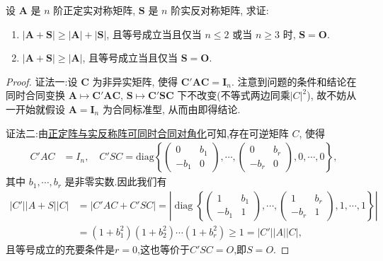 \documentclass[../../main.tex]{subfiles}%
\begin{document}
\begin{proposition}\label{proposition:A+S的行列式的相关结论}
设 \(\boldsymbol{A}\) 是 \(n\) 阶正定实对称矩阵, \(\boldsymbol{S}\) 是 \(n\) 阶实反对称矩阵, 求证:
\begin{enumerate}[(1)]
\item \(|\boldsymbol{A}+\boldsymbol{S}|\geqslant |\boldsymbol{A}|+|\boldsymbol{S}|\), 且等号成立当且仅当 \(n\leqslant 2\) 或当 \(n\geqslant 3\) 时, \(\boldsymbol{S}=\boldsymbol{O}\).
\item \(|\boldsymbol{A}+\boldsymbol{S}|\geqslant |\boldsymbol{A}|\), 且等号成立当且仅当 \(\boldsymbol{S}=\boldsymbol{O}\).
\end{enumerate}
\end{proposition}
\begin{proof}

{\color{blue}证法一:}设 \(\boldsymbol{C}\) 为非异实矩阵, 使得 \(\boldsymbol{C}'\boldsymbol{A}\boldsymbol{C}=\boldsymbol{I}_n\). 注意到问题的条件和结论在同时合同变换 \(\boldsymbol{A}\mapsto\boldsymbol{C}'\boldsymbol{A}\boldsymbol{C}\), \(\boldsymbol{S}\mapsto\boldsymbol{C}'\boldsymbol{S}\boldsymbol{C}\) 下不改变(不等式两边同乘$|C|^2$), 故不妨从一开始就假设 \(\boldsymbol{A}=\boldsymbol{I}_n\) 为合同标准型, 从而由即得结论. 

{\color{blue}证法二:}由\hyperref[proposition:正定阵与实反称阵可同时合同对角化-例9.114]{正定阵与实反称阵可同时合同对角化}可知,存在可逆矩阵 $C$, 使得
\begin{align*}
C'AC &= I_n,\quad C'SC = \mathrm{diag}\left\{\begin{pmatrix}0 & b_1\\ -b_1 & 0\end{pmatrix},\cdots,\begin{pmatrix}0 & b_r\\ -b_r & 0\end{pmatrix},0,\cdots,0\right\},
\end{align*}
其中 $b_1,\cdots,b_r$ 是非零实数.因此我们有
\begin{align*}
|C'||A + S||C| &= |C'AC + C'SC| = \left| \operatorname{diag}\left\{ \begin{pmatrix} 1 & b_1 \\ -b_1 & 1 \end{pmatrix}, \cdots, \begin{pmatrix} 1 & b_r \\ -b_r & 1 \end{pmatrix}, 1, \cdots, 1 \right\} \right| \\
&= (1 + b_1^2)(1 + b_2^2) \cdots (1 + b_r^2) \geqslant 1 = |C'||A||C|,
\end{align*}
且等号成立的充要条件是\( r = 0 \),这也等价于\( C'SC = O \),即\( S = O \).

\end{proof}
\end{document}
